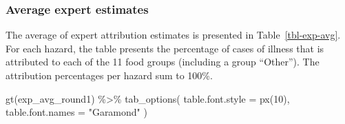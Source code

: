 \documentclass[
  letterpaper,
  DIV=11,
  numbers=noendperiod]{scrartcl}
\newenvironment{Shaded}{\begin{snugshade}}{\end{snugshade}}
\newcommand{\AttributeTok}[1]{\textcolor[rgb]{0.40,0.45,0.13}{#1}}
\newcommand{\DecValTok}[1]{\textcolor[rgb]{0.68,0.00,0.00}{#1}}
\newcommand{\FunctionTok}[1]{\textcolor[rgb]{0.28,0.35,0.67}{#1}}
\newcommand{\NormalTok}[1]{\textcolor[rgb]{0.00,0.23,0.31}{#1}}
\newcommand{\SpecialCharTok}[1]{\textcolor[rgb]{0.37,0.37,0.37}{#1}}
\newcommand{\StringTok}[1]{\textcolor[rgb]{0.13,0.47,0.30}{#1}}
\begin{document}
\subsubsection{Average expert estimates}\label{average-expert-estimates}

The average of expert attribution estimates is presented in
Table~\ref{tbl-exp-avg}. For each hazard, the table presents the
percentage of cases of illness that is attributed to each of the 11 food
groups (including a group ``Other''). The attribution percentages per
hazard sum to 100\%.

\begin{Shaded}
\begin{Highlighting}[]
\FunctionTok{gt}\NormalTok{(exp\_avg\_round1) }\SpecialCharTok{\%\textgreater{}\%} 
  \FunctionTok{tab\_options}\NormalTok{(}
    \AttributeTok{table.font.style =} \FunctionTok{px}\NormalTok{(}\DecValTok{10}\NormalTok{),}
    \AttributeTok{table.font.names =} \StringTok{"Garamond"}
\NormalTok{  )}
\end{Highlighting}
\end{Shaded}

\begin{table}

\caption{\label{tbl-exp-avg}Average of expert attribution estimates in
Round 1 (\%). See full food group names in Figure 16.}


\end{table}%
\end{document}
